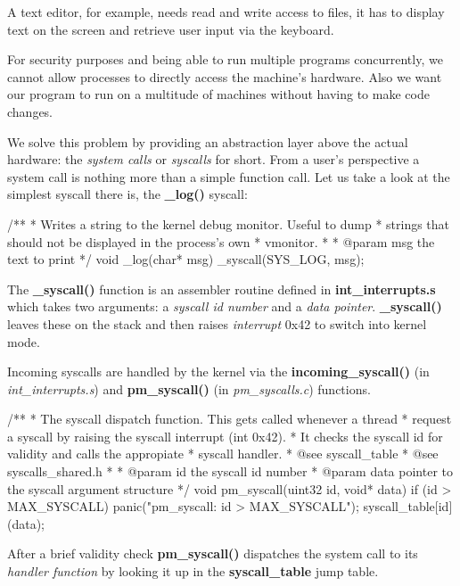 \documentclass[11pt,a4paper]{scrartcl}
\begin{document}
A text editor, for example, needs read and write access to files, it has to display text on the screen and retrieve user input via the keyboard.

For security purposes and being able to run multiple programs concurrently, we cannot allow processes to directly access the machine's hardware. Also we want our program to run on a multitude of machines without having to make code changes.

We solve this problem by providing an abstraction layer above the actual hardware: the \textit{system calls} or \textit{syscalls} for short. From a user's perspective a system call is nothing more than a simple function call. Let us take a look at the simplest syscall there is, the \textbf{\_log()} syscall:

\begin{code}
/**
 * Writes a string to the kernel debug monitor. Useful to dump
 * strings that should not be displayed in the process's own
 * vmonitor.
 * 
 * @param msg the text to print
 */
void _log(char* msg)
{
	_syscall(SYS_LOG, msg);
}
\end{code}

The \textbf{\_syscall()} function is an assembler routine defined in \textbf{int\_interrupts.s} which takes two arguments: a \textit{syscall id number} and a \textit{data pointer}. \textbf{\_syscall()} leaves these on the stack and then raises \textit{interrupt} 0x42 to switch into kernel mode.

Incoming syscalls are handled by the kernel via the \textbf{incoming\_syscall()} (in \textit{ int\_interrupts.s}) and \textbf{pm\_syscall()} (in \textit{pm\_syscalls.c}) functions.

\begin{code}[pm\_syscalls.c]
/**
 * The syscall dispatch function. This gets called whenever a thread
 * request a syscall by raising the syscall interrupt (int 0x42).
 * It checks the syscall id for validity and calls the appropiate
 * syscall handler.
 * @see syscall_table
 * @see syscalls_shared.h
 * 
 * @param id the syscall id number
 * @param data pointer to the syscall argument structure
 */
void pm_syscall(uint32 id, void* data)
{
	if (id > MAX_SYSCALL) {
		panic("pm_syscall: id > MAX_SYSCALL");
	}
	syscall_table[id](data);
}
\end{code}

After a brief validity check \textbf{pm\_syscall()} dispatches the system call to its \textit{handler function} by looking it up in the \textbf{syscall\_table} jump table.
\end{document}
